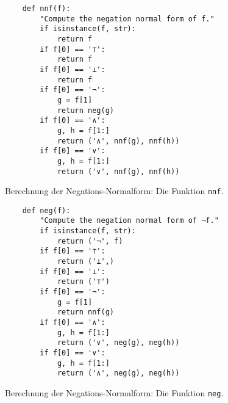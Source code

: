 \begin{figure}[!ht]
  \centering
\begin{verbatim}
    def nnf(f):
        "Compute the negation normal form of f."
        if isinstance(f, str): 
            return f
        if f[0] == '⊤':
            return f
        if f[0] == '⊥':
            return f
        if f[0] == '¬':
            g = f[1]
            return neg(g)
        if f[0] == '∧':
            g, h = f[1:]
            return ('∧', nnf(g), nnf(h))
        if f[0] == '∨':
            g, h = f[1:]
            return ('∨', nnf(g), nnf(h))

\end{verbatim}
\vspace*{-0.3cm}
  \caption{Berechnung der Negations-Normalform: Die Funktion \texttt{nnf}.}
  \label{fig:nnf}
\end{figure}

\begin{figure}[!ht]
  \centering
\begin{verbatim}
    def neg(f):
        "Compute the negation normal form of ¬f."
        if isinstance(f, str): 
            return ('¬', f)
        if f[0] == '⊤':
            return ('⊥',)
        if f[0] == '⊥':
            return ('⊤')
        if f[0] == '¬':
            g = f[1]
            return nnf(g)
        if f[0] == '∧':
            g, h = f[1:]
            return ('∨', neg(g), neg(h))
        if f[0] == '∨':
            g, h = f[1:]
            return ('∧', neg(g), neg(h))
\end{verbatim}
\vspace*{-0.3cm}
  \caption{Berechnung der Negations-Normalform: Die Funktion \texttt{neg}.}
  \label{fig:neg}
\end{figure}



